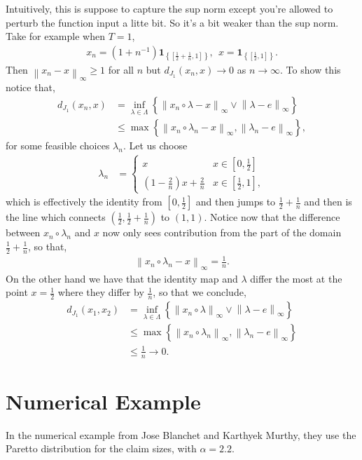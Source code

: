 \documentclass[12pt]{article}
\newcommand\norm[1]{\left\lVert#1\right\rVert}
\theoremstyle{definition}
\theoremstyle{definition}
\theoremstyle{definition}
\begin{document}
Intuitively, this is suppose to capture the sup norm except you're allowed to perturb the function input a litte bit. So it's a bit weaker than the sup norm. Take for example when $T=1$,
\begin{align*}
x_n=(1+n^{-1})\bm{1}_{\left\{[\frac{1}{2}+\frac{1}{n},1]\right\}}, \ \ x = \bm{1}_{\left\{[\frac{1}{2},1]\right\}}.
\end{align*}
Then $\norm{x_n-x}_{\infty}\geq 1$ for all $n$ but $d_{J_1}(x_n,x)\rightarrow 0$ as $n\rightarrow\infty$. To show this notice that,
\begin{align*}
d_{J_1}(x_n,x)&=\inf_{\lambda\in \Lambda}\left\{\norm{x_n\circ \lambda - x}_\infty \lor \norm{\lambda-e}_{\infty}\right\}\\
&\leq \max\left\{\norm{x_n\circ \lambda_n-x}_\infty, \norm{\lambda_n-e}_{\infty}\right\},
\end{align*}
for some feasible choices $\lambda_n$. Let us choose 
\begin{align*}
\lambda_n&=\begin{cases} x & x\in [0,\frac{1}{2}]\\
(1-\frac{2}{n})x + \frac{2}{n}& x\in [\frac{1}{2},1],
\end{cases}
\end{align*}
which is effectively the identity from $[0,\frac{1}{2}]$ and then jumps to $\frac{1}{2}+\frac{1}{n}$ and then is the line which connects $(\frac{1}{2},\frac{1}{2}+\frac{1}{n})$ to $(1,1)$. Notice now that the difference between $x_n\circ \lambda_n$ and $x$ now only sees contribution from the part of the domain $\frac{1}{2}+\frac{1}{n}$, so that,
\begin{align*}
\norm{x_n\circ \lambda_n-x}_{\infty}= \frac{1}{n}.
\end{align*}
On the other hand we have that the identity map and $\lambda$ differ the most at the point $x=\frac{1}{2}$ where they differ by $\frac{1}{n}$, so that we conclude,
\begin{align*}
d_{J_1}(x_1,x_2)&=\inf_{\lambda\in \Lambda}\left\{\norm{x_n\circ \lambda}_\infty \lor \norm{\lambda-e}_{\infty}\right\}\\
&\leq \max\left\{\norm{x_n\circ \lambda_n}_\infty, \norm{\lambda_n-e}_{\infty}\right\}\\
&\leq \frac{1}{n}\rightarrow0.
\end{align*}



\section*{Numerical Example}
In the numerical example from Jose Blanchet and Karthyek Murthy, they use the Paretto distribution for the claim sizes, with $\alpha=2.2$. 
\end{document}
